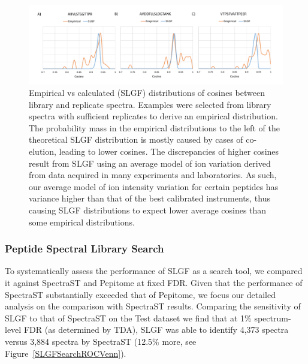 \documentclass[endnotes,11pt]{article}
\begin{document}
\begin{figure}[!h]
 \centering
	\includegraphics[scale=0.42]{SLGFEmpiricals2.pdf}
	\vspace{-0.3in}
  \caption{Empirical vs calculated (SLGF) distributions of cosines between library and replicate spectra. Examples were selected from library spectra with sufficient replicates to derive an empirical distribution. The probability mass in the empirical distributions to the left of the theoretical SLGF distribution is mostly caused by cases of co-elution, leading to lower cosines. The discrepancies of higher cosines result from SLGF using an average model of ion variation derived from data acquired in many experiments and laboratories. As such, our average model of ion intensity variation for certain peptides has variance higher than that of the best calibrated instruments, thus causing SLGF distributions to expect lower average cosines than some empirical distributions. }
	\label{SLGFvsEmpirical}
\end{figure}


\subsubsection{Peptide Spectral Library Search}


To systematically assess the performance of SLGF as a search tool, we compared it against SpectraST and Pepitome at fixed FDR. Given that the performance of SpectraST substantially exceeded that of Pepitome, we focus our detailed analysis on the comparison with SpectraST results. Comparing the sensitivity of SLGF to that of SpectraST on the Test dataset we find that at 1\% spectrum-level FDR (as determined by TDA), SLGF was able to identify 4,373 spectra versus 3,884 spectra by SpectraST (12.5\% more, see Figure~\ref{SLGFSearchROCVenn}).
\end{document}
